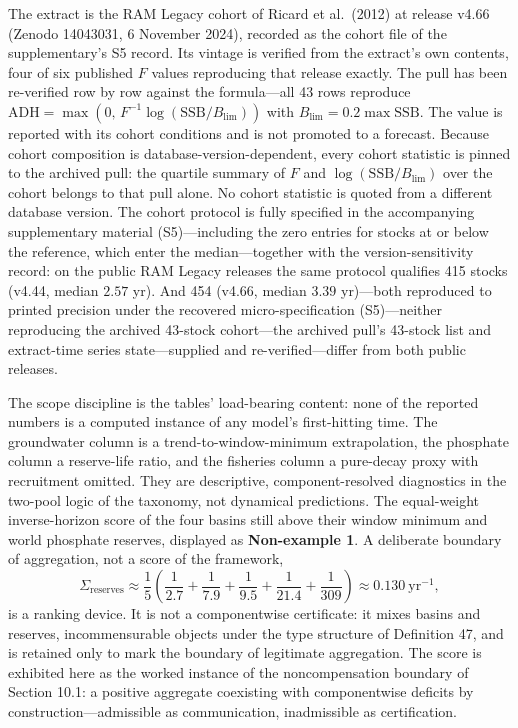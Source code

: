 \documentclass[11pt]{article}
\begin{document}
The extract is the RAM Legacy cohort of Ricard et al.~(2012) at release v4.66 (Zenodo 14043031, 6 November 2024), recorded as the cohort file of the supplementary's S5 record. Its vintage is verified from the extract's own contents, four of six published \(F\) values reproducing that release exactly. The pull has been re-verified row by row against the formula---all 43 rows reproduce \(\mathrm{ADH} = \max(0,\, F^{-1}\log(\mathrm{SSB}/B_{\lim}))\) with \(B_{\lim} = 0.2 \max \mathrm{SSB}\). The value is reported with its cohort conditions and is not promoted to a forecast. Because cohort composition is database-version-dependent, every cohort statistic is pinned to the archived pull: the quartile summary of \(F\) and \(\log(\mathrm{SSB}/B_{\lim})\) over the cohort belongs to that pull alone. No cohort statistic is quoted from a different database version. The cohort protocol is fully specified in the accompanying supplementary material (S5)---including the zero entries for stocks at or below the reference, which enter the median---together with the version-sensitivity record: on the public RAM Legacy releases the same protocol qualifies 415 stocks (v4.44, median \(2.57\) yr). And 454 (v4.66, median \(3.39\) yr)---both reproduced to printed precision under the recovered micro-specification (S5)---neither reproducing the archived 43-stock cohort---the archived pull's 43-stock list and extract-time series state---supplied and re-verified---differ from both public releases.

The scope discipline is the tables' load-bearing content: none of the reported numbers is a computed instance of any model's first-hitting time. The groundwater column is a trend-to-window-minimum extrapolation, the phosphate column a reserve-life ratio, and the fisheries column a pure-decay proxy with recruitment omitted. They are descriptive, component-resolved diagnostics in the two-pool logic of the taxonomy, not dynamical predictions. The equal-weight inverse-horizon score of the four basins still above their window minimum and world phosphate reserves, displayed as \textbf{Non-example 1}. A deliberate boundary of aggregation, not a score of the framework, \[\Sigma_{\mathrm{reserves}} \approx \frac{1}{5}\left( \frac{1}{2.7} + \frac{1}{7.9} + \frac{1}{9.5} + \frac{1}{21.4} + \frac{1}{309} \right) \approx 0.130\ \mathrm{yr}^{-1},\] is a ranking device. It is not a componentwise certificate: it mixes basins and reserves, incommensurable objects under the type structure of Definition 47, and is retained only to mark the boundary of legitimate aggregation. The score is exhibited here as the worked instance of the noncompensation boundary of Section 10.1: a positive aggregate coexisting with componentwise deficits by construction---admissible as communication, inadmissible as certification.
\end{document}
